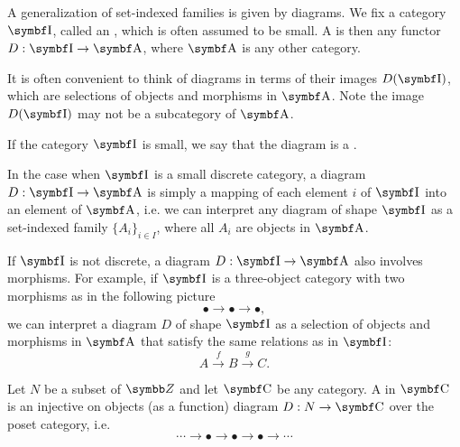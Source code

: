 \begin{definition}\label{def:categorical_diagram}
  A generalization of set-indexed families is given by diagrams. We fix a category \( \Bold I \), called an , which is often assumed to be small. A  is then any functor \( D: \Bold I \to \Bold A \), where \( \Bold A \) is any other category.

  It is often convenient to think of diagrams in terms of their images \( D(\Bold I) \), which are selections of objects and morphisms in \( \Bold A \). Note the image \( D(\Bold I) \) may not be a subcategory of \( \Bold A \).

  If the category \( \Bold I \) is small, we say that the diagram is a .
\end{definition}

\begin{example}\label{ex:categorical_diagrams}
  \mbox{}
  \begin{defenum}
    \item In the case when \( \Bold I \) is a small discrete category, a diagram \( D: \Bold I \to \Bold A \) is simply a mapping of each element \( i \) of \( \Bold I \) into an element of \( \Bold A \), i.e. we can interpret any diagram of shape \( \Bold I \) as a set-indexed family \( \{ A_i \}_{i \in I} \), where all \( A_i \) are objects in \( \Bold A \).

    \item If \( \Bold I \) is not discrete, a diagram \( D: \Bold I \to \Bold A \) also involves morphisms. For example, if \( \Bold I \) is a three-object category with two morphisms as in the following picture
    \begin{equation*}
      \bullet \longrightarrow \bullet \longrightarrow \bullet,
    \end{equation*}
    we can interpret a diagram \( D \) of shape \( \Bold I \) as a selection of objects and morphisms in \( \Bold A \) that satisfy the same relations as in \( \Bold I \):
    \begin{equation*}
      A
      \overset f \longrightarrow
      B
      \overset g \longrightarrow
      C.
    \end{equation*}
  \end{defenum}
\end{example}

\begin{definition}\label{def:tower_diagram}
  Let \( N \) be a subset of \( \Z \) and let \( \Cat{C} \) be any category. A  in \( \Bold{C} \) is an injective on objects (as a function) diagram \( D: N \to \Bold{C} \) over the poset category, i.e.
  \begin{equation}\label{def:tower_diagram/diagram}
    \cdots \longrightarrow \bullet \longrightarrow \bullet \longrightarrow \bullet \longrightarrow \cdots
  \end{equation}
\end{definition}

